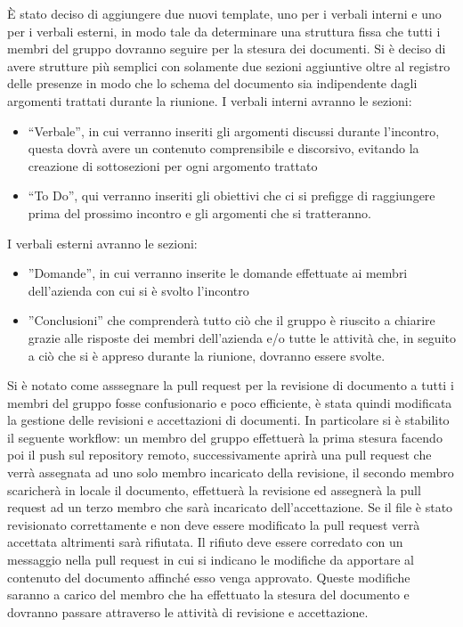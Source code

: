 \documentclass[a4paper, 12pt]{article}
\begin{document}
È stato deciso di aggiungere due nuovi template, uno per i verbali interni e uno per i verbali esterni, in modo tale da determinare una struttura fissa che tutti i membri del gruppo dovranno seguire per la stesura dei documenti.
Si è deciso di avere strutture più semplici con solamente due sezioni aggiuntive oltre al registro delle presenze in modo che lo schema del documento sia indipendente dagli argomenti trattati durante la riunione. 
I verbali interni avranno le sezioni:
\begin{itemize}
    \item “Verbale”, in cui verranno inseriti gli argomenti discussi durante l’incontro, questa dovrà avere un contenuto comprensibile e discorsivo, evitando la creazione di sottosezioni per ogni argomento trattato
    \item “To Do”, qui verranno inseriti gli obiettivi che ci si prefigge di raggiungere prima del prossimo incontro e gli argomenti che si tratteranno.
\end{itemize}
I verbali esterni avranno le sezioni:
\begin{itemize}
    \item ”Domande”, in cui verranno inserite le domande effettuate ai membri dell’azienda con cui si è svolto l’incontro
    \item ”Conclusioni” che comprenderà tutto ciò che il gruppo è riuscito a chiarire grazie alle risposte dei membri dell’azienda e/o tutte le attività che, in seguito a ciò che si è appreso durante la riunione, dovranno essere svolte.
\end{itemize}

Si è notato come asssegnare la pull request per la revisione di documento a tutti i membri del gruppo fosse confusionario e poco efficiente, è stata quindi modificata  la gestione delle revisioni e accettazioni di documenti.
In particolare si è stabilito il seguente workflow: un membro del gruppo effettuerà la prima stesura facendo poi il push sul repository remoto, successivamente aprirà una pull request che verrà assegnata ad uno solo membro incaricato della revisione, il secondo membro scaricherà in locale il documento, effettuerà la revisione ed assegnerà la pull request ad un terzo membro che sarà incaricato dell’accettazione.
Se il file è stato revisionato correttamente e non deve essere modificato la pull request verrà accettata altrimenti sarà rifiutata.
Il rifiuto deve essere corredato con un messaggio nella pull request in cui si indicano le modifiche da apportare al contenuto del documento affinché esso venga approvato.
Queste modifiche saranno a carico del membro che ha effettuato la stesura del documento e dovranno passare attraverso le attività di revisione e accettazione.
\end{document}
